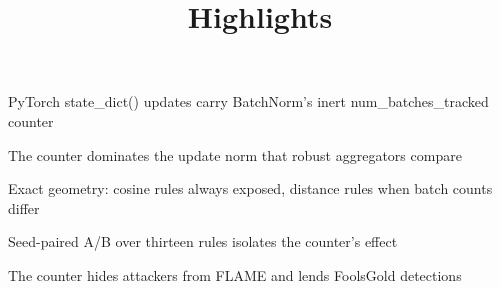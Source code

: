 \documentclass[preprint,12pt]{elsarticle}
\begin{document}
\begin{frontmatter}
\title{Highlights}
\begin{highlights}
\item PyTorch state\_dict() updates carry BatchNorm's inert num\_batches\_tracked counter
\item The counter dominates the update norm that robust aggregators compare
\item Exact geometry: cosine rules always exposed, distance rules when batch counts differ
\item Seed-paired A/B over thirteen rules isolates the counter's effect
\item The counter hides attackers from FLAME and lends FoolsGold detections
\end{highlights}
\end{frontmatter}
\end{document}
